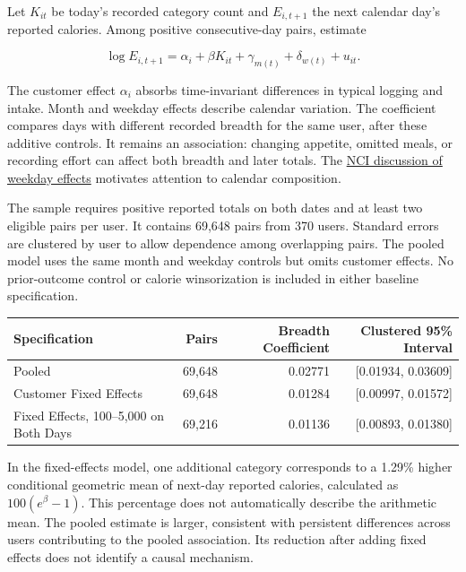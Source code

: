 Let \(K_{it}\) be today's recorded category count and \(E_{i,t+1}\) the
next calendar day's reported calories. Among positive consecutive-day
pairs, estimate

\[
\log E_{i,t+1}=\alpha_i+\beta K_{it}+\gamma_{m(t)}+\delta_{w(t)}+u_{it}.
\]

The customer effect \(\alpha_i\) absorbs time-invariant differences in
typical logging and intake. Month and weekday effects describe calendar
variation. The coefficient compares days with different recorded breadth
for the same user, after these additive controls. It remains an
association: changing appetite, omitted meals, or recording effort can
affect both breadth and later totals. The
\href{https://epi.grants.cancer.gov/dietary-assessment-primer/learn/day.html}{NCI
discussion of weekday effects} motivates attention to calendar
composition.

The sample requires positive reported totals on both dates and at least
two eligible pairs per user. It contains 69,648 pairs from 370 users.
Standard errors are clustered by user to allow dependence among
overlapping pairs. The pooled model uses the same month and weekday
controls but omits customer effects. No prior-outcome control or calorie
winsorization is included in either baseline specification.

\begin{table}[H]
\centering\small
\begin{tabular}{@{}lrrr@{}}
\toprule
Specification & Pairs & Breadth Coefficient & Clustered 95\% Interval \\
\midrule

Pooled & 69,648 & 0.02771 & {[}0.01934, 0.03609{]} \\
Customer Fixed Effects & 69,648 & 0.01284 & {[}0.00997, 0.01572{]} \\
Fixed Effects, 100--5,000 on Both Days & 69,216 & 0.01136 & {[}0.00893,
0.01380{]} \\
\bottomrule
\end{tabular}
\end{table}

In the fixed-effects model, one additional category corresponds to a
1.29\% higher conditional geometric mean of next-day reported calories,
calculated as \(100(e^{\beta}-1)\). This percentage does not
automatically describe the arithmetic mean. The pooled estimate is
larger, consistent with persistent differences across users contributing
to the pooled association. Its reduction after adding fixed effects does
not identify a causal mechanism.

